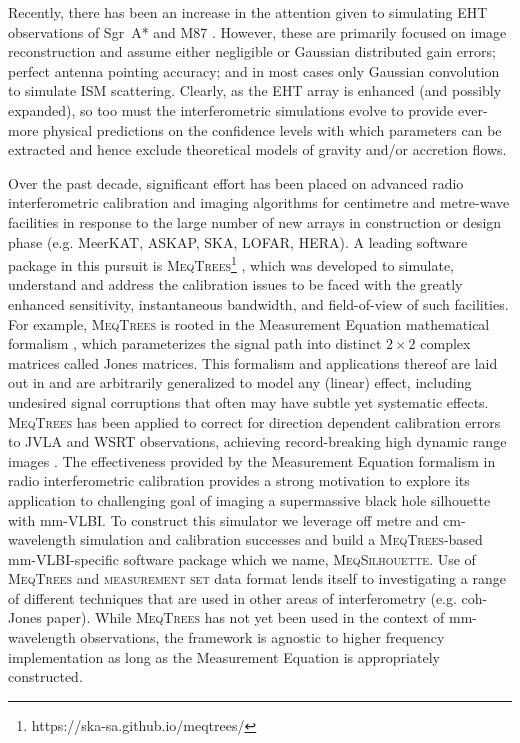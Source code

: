 Recently, there has been an increase in the attention given to simulating EHT observations of Sgr~A*  and M87 \citep{Fish_2014,Lu_2014,Bouman_2015,Lu_2016,Chael_2016}. However, these are primarily focused on image reconstruction and assume either negligible or Gaussian distributed gain errors; perfect antenna pointing accuracy; and in most cases only Gaussian convolution to simulate ISM scattering. Clearly, as the EHT array is enhanced (and possibly expanded), so too must the interferometric simulations evolve to provide ever-more physical predictions on the confidence levels with which parameters can be extracted and hence exclude theoretical models of gravity and/or accretion flows.


Over the past decade, significant effort has been placed on advanced radio interferometric calibration and imaging algorithms for centimetre and metre-wave facilities in response to the large number of new arrays in construction or design phase (e.g. MeerKAT, ASKAP, SKA, LOFAR, HERA). A leading software package in this pursuit is \textsc{MeqTrees}\footnote{https://ska-sa.github.io/meqtrees/} \citep*{Noordam_2010}, which was developed to simulate, understand and address the calibration issues to be faced with the greatly enhanced sensitivity, instantaneous bandwidth, and field-of-view of such facilities. For example, \textsc{MeqTrees} is rooted in the Measurement Equation mathematical formalism \citep{Hamaker_1996}, which parameterizes the signal path into distinct $2 \times 2$ complex  matrices called Jones matrices. This formalism and applications thereof are laid out in \citep{Smirnov_2011a,Smirnov_2011b,Smirnov_2011c} and are arbitrarily generalized to model any (linear) effect, including undesired signal corruptions that often may have subtle yet systematic effects. \textsc{MeqTrees} has been applied to correct for direction dependent calibration errors to JVLA and WSRT observations, achieving record-breaking high dynamic range images \citep{Smirnov_2011c}. The effectiveness provided by the Measurement Equation formalism in radio interferometric calibration provides a strong motivation to explore its application to challenging goal of imaging a supermassive black hole silhouette with mm-VLBI. To construct this simulator we leverage off metre and cm-wavelength simulation and calibration successes and build a \textsc{MeqTrees}-based mm-VLBI-specific software package which we name, \textsc{MeqSilhouette}.  Use of \textsc{MeqTrees} and \textsc{measurement set} data format lends itself to investigating a range of different techniques that are used in other areas of interferometry (e.g. coh-Jones paper). While \textsc{MeqTrees} has not yet been used in the context of mm-wavelength observations, the framework is agnostic to higher frequency implementation as long as the Measurement Equation is appropriately constructed. 


